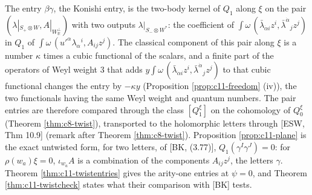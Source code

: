 \begin{remark}
The entry $\beta\gamma$, the Konishi entry, is the two-body kernel of $Q_1$ along $\xi$ on the pair $(\lambda|_{S_+\otimes W},A|_{W_{\mathbb R}^\perp})$ with two outputs $\lambda|_{S_-\otimes W^*}$: the coefficient of $\int\omega\,(\bar\lambda_{\dot\alpha i}z^i,\bar\lambda^{\dot\alpha}{}_jz^j)$ in $Q_1$ of $\int\omega\,(u'^\alpha\lambda_\alpha{}^i,A_{ij}z^j)$. The classical component of this pair along $\xi$ is a number $\kappa$ times a cubic functional of the scalars, and a finite part of the operators of Weyl weight $3$ that adds $y\int\omega\,(\bar\lambda_{\dot\alpha i}z^i,\bar\lambda^{\dot\alpha}{}_jz^j)$ to that cubic functional changes the entry by $-\kappa y$ (Proposition \ref{prop:c11-freedom} (iv)), the two functionals having the same Weyl weight and quantum numbers. The pair entries are therefore compared through the class $[Q^\xi_1]$ on the cohomology of $Q^\xi_0$ (Theorem \ref{thm:c8-twist}), transported to the holomorphic letters through [ESW, Thm 10.9] (remark after Theorem \ref{thm:c8-twist}). Proposition \ref{prop:c11-plane} is the exact untwisted form, for two letters, of [BK, (3.77)], $Q_1(\gamma^I\gamma^J)=0$: for $\rho(w_a)\xi=0$, $\iota_{w_a}A$ is a combination of the components $A_{ij}z^j$, the letters $\gamma$. Theorem \ref{thm:c11-twistentries} gives the arity-one entries at $\psi=0$, and Theorem \ref{thm:c11-twistcheck} states what their comparison with [BK] tests.
\end{remark}

